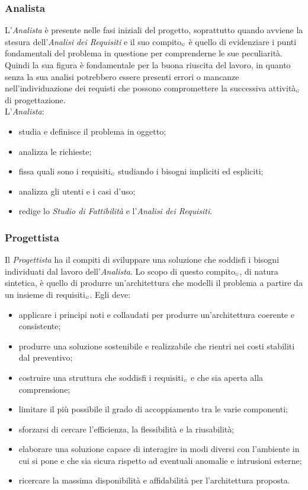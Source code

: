 \subsubsection{Analista}\label{ProcessiOrganizzativiProcessoDiPianificazioneRuoliDiProgettoAnalista}

L'\textit{Analista} è presente nelle fasi iniziali del progetto, soprattutto quando avviene la stesura dell'\textit{Analisi dei Requisiti} e il suo compito$_{\scaleto{G}{3pt}}$ è quello di evidenziare i punti fondamentali del problema in questione per comprenderne le sue peculiarità. Quindi la sua figura è fondamentale per la buona riuscita del lavoro, in quanto senza la sua analisi potrebbero essere presenti errori o mancanze nell'individuazione dei requisti che possono compromettere la successiva attività$_{\scaleto{G}{3pt}}$ di progettazione.\\
L'\textit{Analista}:
\begin{itemize}
	\item studia e definisce il problema in oggetto;
	\item analizza le richieste;
	\item fissa quali sono i requisiti$_{\scaleto{G}{3pt}}$ studiando i bisogni impliciti ed espliciti;
	\item analizza gli utenti e i casi d'uso;
	\item redige lo \textit{Studio di Fattibilità} e l'\textit{Analisi dei Requisiti}. 
\end{itemize}

\subsubsection{Progettista}\label{ProcessiOrganizzativiProcessoDiPianificazioneRuoliDiProgettoProgettista}

Il \textit{Progettista} ha il compiti di sviluppare una soluzione che soddisfi i bisogni individuati dal lavoro dell'\textit{Analista}. Lo scopo di questo compito$_{\scaleto{G}{3pt}}$, di natura sintetica, è quello di produrre un'architettura che modelli il problema a partire da un insieme di requisiti$_{\scaleto{G}{3pt}}$. Egli deve:
\begin{itemize}
	\item applicare i principi noti e collaudati per produrre un'architettura coerente e consistente;
	\item produrre una soluzione sostenibile e realizzabile che rientri nei costi stabiliti dal preventivo;
	\item costruire una struttura che soddisfi i requisiti$_{\scaleto{G}{3pt}}$ e che sia aperta alla comprensione;
	\item limitare il più possibile il grado di accoppiamento tra le varie componenti;
	\item sforzarsi di cercare l'efficienza, la flessibilità e la riusabilità;
	\item elaborare una soluzione capace di interagire in modi diversi con l'ambiente in cui si pone e che sia sicura rispetto ad eventuali anomalie e intrusioni esterne;
	\item ricercare la massima disponibilità e affidabilità per l'architettura proposta.
\end{itemize}

